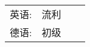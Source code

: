 %
%


\begin{tabular}{lrll}
	\textsc{英语:} & \textsc{流利} \\
	\textsc{德语:} & \textsc{初级} \\
\end{tabular}
